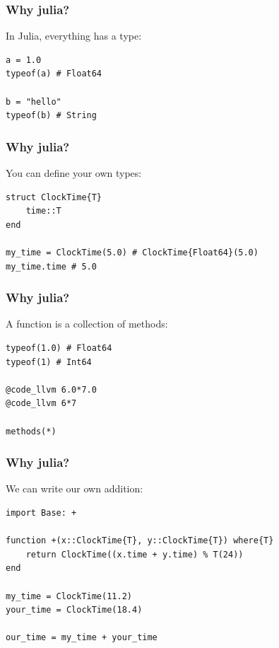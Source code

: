 \documentclass{beamer}
\begin{document}
    \begin{frame}[fragile]
        \frametitle{Why julia?}
        In Julia, everything has a type:
        \vspace{0.5cm}
        \begin{lstlisting}[language=JuliaLocal, style=julia]
a = 1.0
typeof(a) # Float64

b = "hello"
typeof(b) # String\end{lstlisting}
    \end{frame}

    \begin{frame}[fragile]
        \frametitle{Why julia?}
        You can define your own types:
        \vspace{0.5cm}
        \begin{lstlisting}[language=JuliaLocal, style=julia]
struct ClockTime{T}
    time::T
end

my_time = ClockTime(5.0) # ClockTime{Float64}(5.0)
my_time.time # 5.0\end{lstlisting}
    \end{frame}

    \begin{frame}[fragile]
        \frametitle{Why julia?}
        A function is a collection of methods:
        \vspace{0.5cm}
        \begin{lstlisting}[language=JuliaLocal, style=julia]
typeof(1.0) # Float64
typeof(1) # Int64

@code_llvm 6.0*7.0
@code_llvm 6*7

methods(*)
\end{lstlisting}
    \end{frame}

        \begin{frame}[fragile]
        \frametitle{Why julia?}
        We can write our own addition:
        \vspace{0.5cm}
        \begin{lstlisting}[language=JuliaLocal, style=julia, basicstyle=\scriptsize\JuliaMonoRegular]
import Base: +

function +(x::ClockTime{T}, y::ClockTime{T}) where{T}
    return ClockTime((x.time + y.time) % T(24))
end

my_time = ClockTime(11.2)
your_time = ClockTime(18.4)

our_time = my_time + your_time
\end{lstlisting}
    \end{frame}
\end{document}
